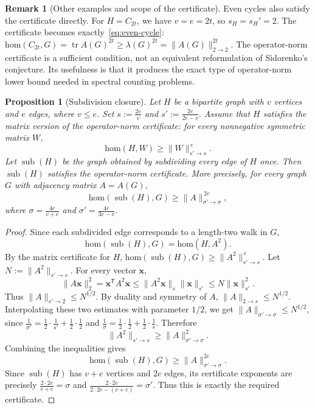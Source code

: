 \documentclass[11pt]{article}
\newtheorem{proposition}[theorem]{Proposition}
\theoremstyle{definition}
\newtheorem{remark}{Remark}
\theoremstyle{plain}
\newcommand{\homc}{\mathrm{hom}}
\begin{document}
\begin{remark}[Other examples and scope of the certificate]
Even cycles also satisfy the certificate directly.  For \(H=C_{2t}\),
we have \(v=e=2t\), so \(s_H=s_H'=2\).  The certificate becomes exactly~\eqref{eq:even-cycle}: 
$        \homc(C_{2t},G)
        =
        \operatorname{tr}A(G)^{2t}
        \ge
        \lambda(G)^{2t}
        =
        \|A(G)\|_{2\to2}^{2t}.
$ The operator-norm certificate is a sufficient condition, not an
equivalent reformulation of Sidorenko's conjecture.  Its usefulness is
that it produces the exact type of operator-norm lower bound needed in
spectral counting problems.
\end{remark}

\begin{proposition}[Subdivision closure]
\label{prop:subdivision-closure-certificate}
Let \(H\) be a bipartite graph with \(v\) vertices and \(e\) edges, where
\(v\le e\).  Set $       s:=\frac{2e}{v}$ and 
$        s':=\frac{2e}{2e-v}.
$
Assume that \(H\) satisfies the matrix version of the operator-norm
certificate: for every nonnegative symmetric matrix \(W\),
\[
        \homc(H,W)\ge \|W\|_{s'\to s}^{\,e}.
\]
Let \(\operatorname{sub}(H)\) be the graph obtained by subdividing every
edge of \(H\) once.  Then \(\operatorname{sub}(H)\) satisfies the
operator-norm certificate.  More precisely, for every graph \(G\) with
adjacency matrix \(A=A(G)\),
\[
        \homc(\operatorname{sub}(H),G)
        \ge
        \|A\|_{\sigma'\to\sigma}^{\,2e},
\]
where        $\sigma=\frac{4e}{v+e}$ and 
$        \sigma'=\frac{4e}{3e-v}.
$
\end{proposition}

\begin{proof}
Since each subdivided edge corresponds to a length-two walk in \(G\),
\[
        \homc(\operatorname{sub}(H),G)=\homc(H,A^2).
\]
By the matrix certificate for \(H\),
$ \homc(\operatorname{sub}(H),G)
        \ge
        \|A^2\|_{s'\to s}^{\,e}.$
Let \(N:=\|A^2\|_{s'\to s}\).  For every vector \(\bm{x}\),
\[
        \|A\bm{x}\|_2^2
        =
        \bm{x}^{\mathsf T}A^2\bm{x}
        \le
        \|A^2\bm{x}\|_s\|\bm{x}\|_{s'}
        \le
        N\|\bm{x}\|_{s'}^2.
\]
Thus   $ \|A\|_{s'\to2}\le N^{1/2}.$
By duality and symmetry of \(A\),
$        \|A\|_{2\to s}\le N^{1/2}.
$
Interpolating these two estimates with parameter \(1/2\), we get $\|A\|_{\sigma'\to\sigma}\le N^{1/2},$
since
$\frac1{\sigma'}
        =
        \frac12\cdot\frac1{s'}
        +
        \frac12\cdot\frac12
$ and $\frac1{\sigma}
        =
        \frac12\cdot\frac12
        +
        \frac12\cdot\frac1s.$
Therefore
\[
        \|A^2\|_{s'\to s}\ge \|A\|_{\sigma'\to\sigma}^2.
\]
Combining the inequalities gives
\[
        \homc(\operatorname{sub}(H),G)
        \ge
        \|A\|_{\sigma'\to\sigma}^{2e}.
\]
Since \(\operatorname{sub}(H)\) has \(v+e\) vertices and \(2e\) edges, its certificate exponents are precisely
        $\frac{2\cdot 2e}{v+e}=\sigma$ and 
$        \frac{2\cdot 2e}{2\cdot 2e-(v+e)}=\sigma'.
$
Thus this is exactly the required certificate.
\end{proof}
\end{document}
